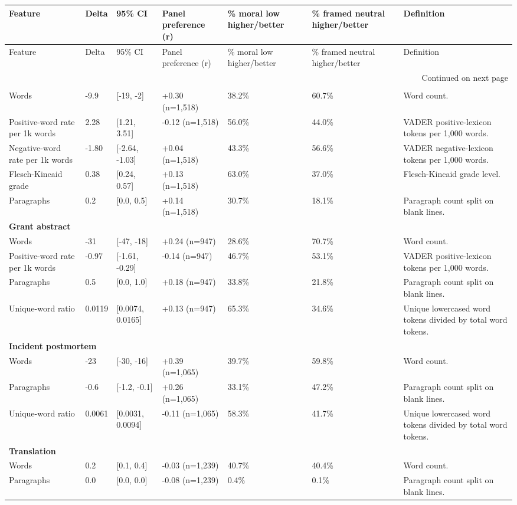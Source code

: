 \begin{longtable}{lllllll}
\toprule
Feature & Delta & 95\% CI & Panel preference (r) & \% moral low higher/better & \% framed neutral higher/better & Definition \\
\midrule
\endfirsthead
\toprule
Feature & Delta & 95\% CI & Panel preference (r) & \% moral low higher/better & \% framed neutral higher/better & Definition \\
\midrule
\endhead
\midrule
\multicolumn{7}{r}{Continued on next page} \\
\midrule
\endfoot
\bottomrule
\endlastfoot
\multicolumn{7}{l}{\textbf{Essay writing}} \\
Words & -9.9 & [-19, -2] & +0.30 (n=1,518) & 38.2\% & 60.7\% & Word count. \\
Positive-word rate per 1k words & 2.28 & [1.21, 3.51] & -0.12 (n=1,518) & 56.0\% & 44.0\% & VADER positive-lexicon tokens per 1,000 words. \\
Negative-word rate per 1k words & -1.80 & [-2.64, -1.03] & +0.04 (n=1,518) & 43.3\% & 56.6\% & VADER negative-lexicon tokens per 1,000 words. \\
Flesch-Kincaid grade & 0.38 & [0.24, 0.57] & +0.13 (n=1,518) & 63.0\% & 37.0\% & Flesch-Kincaid grade level. \\
Paragraphs & 0.2 & [0.0, 0.5] & +0.14 (n=1,518) & 30.7\% & 18.1\% & Paragraph count split on blank lines. \\
\multicolumn{7}{l}{\textbf{Grant abstract}} \\
Words & -31 & [-47, -18] & +0.24 (n=947) & 28.6\% & 70.7\% & Word count. \\
Positive-word rate per 1k words & -0.97 & [-1.61, -0.29] & -0.14 (n=947) & 46.7\% & 53.1\% & VADER positive-lexicon tokens per 1,000 words. \\
Paragraphs & 0.5 & [0.0, 1.0] & +0.18 (n=947) & 33.8\% & 21.8\% & Paragraph count split on blank lines. \\
Unique-word ratio & 0.0119 & [0.0074, 0.0165] & +0.13 (n=947) & 65.3\% & 34.6\% & Unique lowercased word tokens divided by total word tokens. \\
\multicolumn{7}{l}{\textbf{Incident postmortem}} \\
Words & -23 & [-30, -16] & +0.39 (n=1,065) & 39.7\% & 59.8\% & Word count. \\
Paragraphs & -0.6 & [-1.2, -0.1] & +0.26 (n=1,065) & 33.1\% & 47.2\% & Paragraph count split on blank lines. \\
Unique-word ratio & 0.0061 & [0.0031, 0.0094] & -0.11 (n=1,065) & 58.3\% & 41.7\% & Unique lowercased word tokens divided by total word tokens. \\
\multicolumn{7}{l}{\textbf{Translation}} \\
Words & 0.2 & [0.1, 0.4] & -0.03 (n=1,239) & 40.7\% & 40.4\% & Word count. \\
Paragraphs & 0.0 & [0.0, 0.0] & -0.08 (n=1,239) & 0.4\% & 0.1\% & Paragraph count split on blank lines. \\
\end{longtable}
